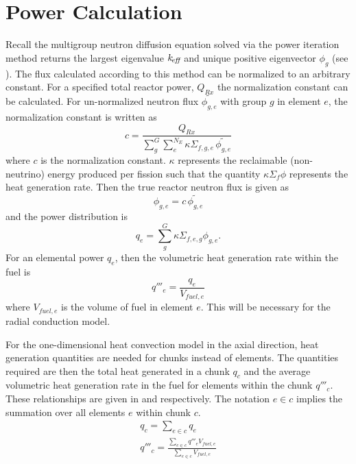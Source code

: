 \section{Power Calculation}
  Recall the multigroup neutron diffusion equation solved via the power
  iteration method returns the largest eigenvalue $k_{\!\mbox{\scriptsize \em eff}}$ and unique positive
  eigenvector $\phi_g$ (see ). The flux calculated
  according to this method can be normalized to an arbitrary constant. For a
  specified total reactor power, $Q_{Rx}$ the normalization constant can be 
  calculated. For un-normalized neutron flux $\widetilde{\phi_{g,e}}$ with group
  $g$ in element $e$, the normalization constant is written as
  \begin{equation}
    \label{eq:normalization_c}
    c = \frac{Q_{Rx}}{\sum_{g}^{G} \sum_{e}^{N_E} \kappa \Sigma_{f,g,e} \,
      \widetilde{\phi_{g,e}}}
  \end{equation}
  where $c$ is the normalization constant. $\kappa$ represents the reclaimable
  (non-neutrino) energy produced per fission such that the quantity $\kappa
  \Sigma_f \phi$ represents the heat generation rate. Then the true reactor
  neutron flux is given as
  \begin{equation}
    \label{eq:normalization_phi}
    \phi_{g,e} = c \, \widetilde{\phi_{g,e}}
  \end{equation}
  and the power distribution is 
  \begin{equation}
    \label{eq:normalization_q}
    q_{e} = \sum_g^G \kappa \Sigma_{f,e,g} \phi_{g,e}.
  \end{equation}
  For an elemental power $q_e$, then the volumetric heat generation rate within
  the fuel is 
  \begin{equation}
    \label{eq:elementqppp_fuel}
    q'''_{e} = \frac{q_e}{V_{fuel,e}}
  \end{equation}
  where $V_{fuel,e}$ is the volume of fuel in element $e$. This will be
  necessary for the radial conduction model.

  For the one-dimensional heat convection model in the axial direction,
  heat generation quantities are needed for chunks instead of elements.
  The quantities required are then the total heat generated in a chunk $q_c$ and
  the average volumetric heat generation rate in the fuel for elements within
  the chunk $q'''_c$. These relationships are given in  and
   respectively. The notation $e \in c$ implies the
  summation over all elements $e$ within chunk $c$.
  \begin{align}
    \label{eq:chunkpwr}
    q_c = \sum_{e \in c} q_e \\
    \label{eq:chunkqppp_fuel}
    q'''_c = \frac{\sum_{e \in c} q'''_e V_{fuel,e}}{\sum_{e \in c} V_{fuel,e}}
  \end{align}

